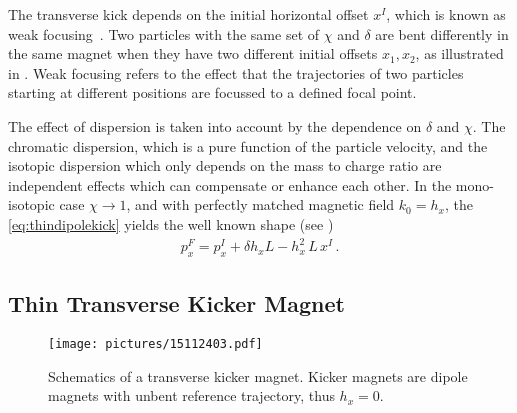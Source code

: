 %
The transverse kick depends on the initial horizontal offset $x^I$, which is known as weak focusing~\cite{wolski2014beam}. Two particles with the same set of $\chi$ and $\delta$ are bent differently in the same magnet when they have two different initial offsets $x_1,x_2$, as illustrated in . Weak focusing refers to the effect that the trajectories of two particles starting at different positions are focussed to a defined focal point. 

%
The effect of dispersion is taken into account by the dependence on $\delta$ and $\chi$. The chromatic dispersion, which is a pure function of the particle velocity, and the isotopic dispersion which only depends on the mass to charge ratio are independent effects which can compensate or enhance each other. In the mono-isotopic case $\chi \rightarrow 1$, and with perfectly matched magnetic field $k_0=h_x$, the \eqref{eq:thindipolekick} yields the well known shape (see \cite{CERN-SL-95-12})
\begin{align}
p_x^F = p_x^I + \delta h_x L - h_x^2 \, L \, x^I \, .
\end{align} 








\subsection{Thin Transverse Kicker Magnet}

  \begin{figure}[b]
  \centering
  \texttt{[image: pictures/15112403.pdf]}
  \caption{Schematics of a transverse kicker magnet. Kicker magnets are dipole magnets with unbent reference trajectory, thus $h_x=0$. }  
  \label{pic:15112403}
  \end{figure}


